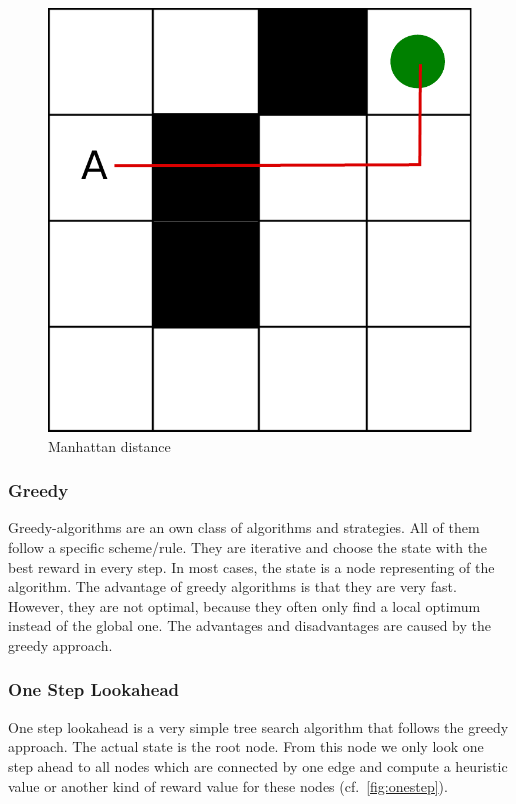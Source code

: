 \begin{figure}
\centering
\includegraphics[scale=0.3]{images/manhatten.pdf}
\caption{Manhattan distance}
\label{fig:manhatten}
\end{figure}



\subsubsection{Greedy}

Greedy-algorithms are an own class of algorithms and strategies. All of them follow a specific scheme/rule. They are iterative and choose the state with the best reward in every step. In most cases, the state is a node representing of the algorithm. The advantage of greedy algorithms is that they are very fast. However, they are not optimal, because they often only find a local optimum instead of the global one. The advantages and disadvantages are caused by the greedy approach.  

\subsubsection{One Step Lookahead}

One step lookahead is a very simple tree search algorithm that follows the greedy approach. The actual state is the root node. From this node we only look one step ahead to all nodes which are connected by one edge and compute a heuristic value or another kind of reward value for these nodes (cf.~\cref{fig:onestep}). 

